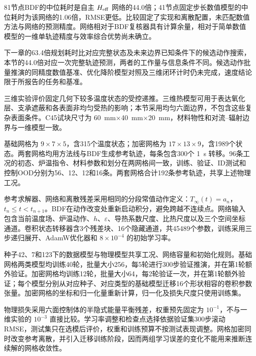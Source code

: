 81节点BDF的中位耗时是自主 ${H_{\mathrm{eff}}}$ 网络的44.0倍；41节点固定步长数值模型的中位耗时为该网络的1.06倍，RMSE更低。比较固定了实现和离散配置，未匹配数值方法与网络的预测精度。网络相对于BDF复核器具有计算余量，相对于简单数值模型的一维单轨迹精度与效率综合优势尚未确立。

下一章的63.4倍规划耗时比对应完整状态及未来边界已知条件下的候选动作搜索，本节的44.0倍对应一次完整轨迹预测，两者的工作量与信息条件不同。候选动作批量推演的同精度数值基准、优化降阶模型对照及三维闭环计时仍未完成，速度结论限于所报告的任务和基准。



三维实验评价固定几何下较多温度状态的受控递推。三维热模型可用于表达氧化层、支承遮蔽和各表面非均匀受热的影响\cite{yang2022reheating3d}；本节采用均匀六面边界，不包含这些复杂表面条件。C45试块尺寸为 \SI{60}{\milli\metre}$\times$\SI{40}{\milli\metre}$\times$\SI{20}{\milli\metre}，材料物性和对流--辐射边界与一维模型一致。

基础网格为 $9\times7\times5$，含315个温度状态；加密网格为 $17\times13\times9$，含1989个状态。两套网格均用方法线与BDF生成参考轨迹，每条包含300个 \SI{1}{\second} 转移。96条工况的初态、炉温指令、材料参数和划分在两网格间一致，训练、验证、ID测试和控制OOD分别为56、12、12和16条。两套网格合计192条参考轨迹，共享上述物理工况。

参考求解器、网络和离散残差采用相同的分段常值动作定义：$T_\infty(t)=a_n$，$t_n\le t<t_{n+1}$。BDF在动作改变处重新启动积分，避免跨越不连续点。网络输入包含当前温度场、炉温动作、$h$、$\varepsilon$、导热系数尺度、比热尺度以及三个空间坐标通道。卷积状态转移器含3个残差块、16个隐藏通道，共45489个参数，训练采用三步递归展开、AdamW优化器和 $8\times10^{-4}$ 的初始学习率。

种子42、7和123下的数据模型与物理模型共享工况、网络容量和初始化规则。基础网格两类模型均训练40轮，批量大小256，每5轮进行300步验证推演，并在第1轮额外验证。加密网格均训练12轮，批量大小64，每2轮验证一次，并在第1轮额外验证；每个模型分别从对应种子、对应类型的基础模型迁移16个形状相容的卷积参数张量。加密网格的坐标和归一化量重新计算，归一化及损失尺度只使用训练集。

物理损失采用六面控制体的半隐式能量平衡残差，权重预先固定为 $10^{-1}$，不与一维实验的 $10^{-3}$ 直接比较。学习率调整和检查点选择依据验证集300步滚动RMSE，测试集只在选模后评价，权重和训练预算不按测试表现调整。网格加密同时改变参考离散，并引入迁移训练阶段，因而两组学习误差的变化不能用来推断连续解的网格收敛性。

